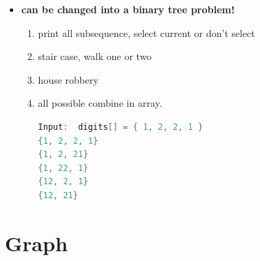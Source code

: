 \documentclass[a4paper,11pt,twoside]{book}
\begin{document}
\begin{itemize}
\item \textbf{can be changed into a binary tree problem!}
\begin{enumerate}
	\item print all subsequence, select current or don't select
	\item stair case, walk one or two
	\item house robbery
	\item all possible combine in array. 
	
\begin{lstlisting}[frame=single, language=c++]	
Input:  digits[] = { 1, 2, 2, 1 }	
{1, 2, 2, 1} 
{1, 2, 21} 
{1, 22, 1} 
{12, 2, 1} 
{12, 21} 
\end{lstlisting}
\end{enumerate}

\end{itemize}




\section{Graph}
\end{document}
